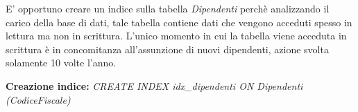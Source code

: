 E' opportuno creare un indice sulla tabella \emph{Dipendenti} perchè analizzando il carico della base di dati, tale tabella contiene dati che vengono acceduti spesso in lettura ma non in scrittura. L'unico momento in cui la tabella viene acceduta in scrittura è in concomitanza all'assunzione di nuovi dipendenti, azione svolta solamente 10 volte l'anno.
\begin{flushleft}
	\textbf{{Creazione indice:}} \emph{CREATE INDEX idx\_dipendenti ON Dipendenti (CodiceFiscale)}
\end{flushleft}

